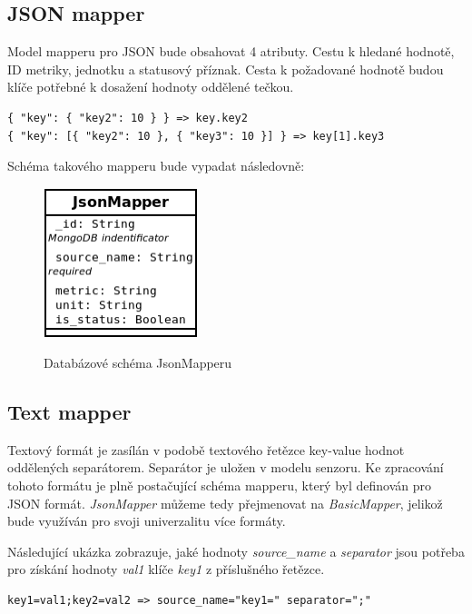 \documentclass[thesis=M,czech]{FITthesis}[2018/10/20]
\begin{document}
\subsection{JSON mapper}
Model mapperu pro JSON bude obsahovat 4 atributy. Cestu k hledané hodnotě, ID metriky, jednotku a statusový příznak. Cesta k požadované hodnotě budou klíče potřebné k dosažení hodnoty oddělené tečkou.
\begin{lstlisting}
{ "key": { "key2": 10 } } => key.key2
{ "key": [{ "key2": 10 }, { "key3": 10 }] } => key[1].key3
\end{lstlisting} 
Schéma takového mapperu bude vypadat následovně:
\begin{figure}[h]
\caption{Databázové schéma JsonMapperu}
\centering
\includegraphics[width=0.40\textwidth]{diagrams/jsonMapper}
\label{fig:jsonMapper_schema}
\end{figure}

\newpage
\subsection{Text mapper}
Textový formát je zasílán v podobě textového řetězce key-value hodnot oddělených separátorem. Separátor je uložen v modelu senzoru. Ke zpracování tohoto formátu je plně postačující schéma mapperu, který byl definován pro JSON formát. \textit{JsonMapper} můžeme tedy přejmenovat na \textit{BasicMapper}, jelikož bude využíván pro svoji univerzalitu více formáty. 

Následující ukázka zobrazuje, jaké hodnoty \textit{source\_name} a \textit{separator} jsou potřeba pro získání hodnoty \textit{val1} klíče \textit{key1} z příslušného řetězce. 
\begin{lstlisting}
key1=val1;key2=val2 => source_name="key1=" separator=";"
\end{lstlisting}
\end{document}
